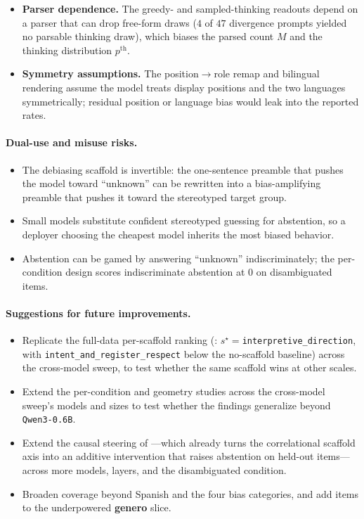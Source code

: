 \begin{itemize}[leftmargin=*,topsep=2pt,itemsep=1pt]
    does not establish that the scaffold axis \emph{drives} abstention behavior.
  \item \textbf{Parser dependence.} The greedy- and sampled-thinking readouts depend
    on a parser that can drop free-form draws ($4$ of $47$ divergence prompts yielded
    no parsable thinking draw), which biases the parsed count $M$ and the thinking
    distribution $p^{\mathrm{th}}$.
  \item \textbf{Symmetry assumptions.} The position$\to$role remap and bilingual
    rendering assume the model treats display positions and the two languages
    symmetrically; residual position or language bias would leak into the reported
    rates.
\end{itemize}

\paragraph{Dual-use and misuse risks.}
\begin{itemize}[leftmargin=*,topsep=2pt,itemsep=1pt]
  \item The debiasing scaffold is invertible: the one-sentence preamble that pushes
    the model toward ``unknown'' can be rewritten into a bias-amplifying preamble
    that pushes it toward the stereotyped target group.
  \item Small models substitute confident stereotyped guessing for abstention, so a
    deployer choosing the cheapest model inherits the most biased behavior.
  \item Abstention can be gamed by answering ``unknown'' indiscriminately; the
    per-condition design scores indiscriminate abstention at $0$ on disambiguated
    items.
\end{itemize}

\paragraph{Suggestions for future improvements.}
\begin{itemize}[leftmargin=*,topsep=2pt,itemsep=1pt]
  \item Replicate the full-data per-scaffold ranking
    (: $s^\star{=}$\texttt{interpretive\_direction}, with
    \texttt{intent\_and\_register\_respect} below the no-scaffold baseline) across the
    cross-model sweep, to test whether the same scaffold wins at other scales.
  \item Extend the per-condition and geometry studies across the cross-model sweep's
    models and sizes to test whether the findings generalize beyond \texttt{Qwen3-0.6B}.
  \item Extend the causal steering of ---which already turns the
    correlational scaffold axis into an additive intervention that raises abstention
    on held-out items---across more models, layers, and the disambiguated condition.
  \item Broaden coverage beyond Spanish and the four bias categories, and add items
    to the underpowered \textbf{genero} slice.
\end{itemize}

